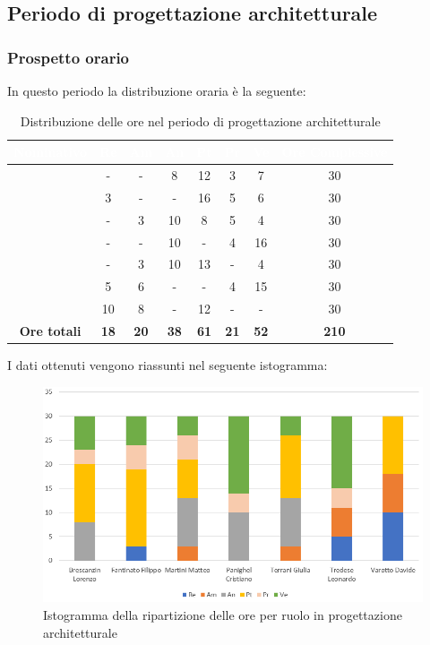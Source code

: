 \subsection{Periodo di progettazione architetturale}\label{PreventiviPArchitetturale}
\subsubsection{Prospetto orario}
In questo periodo la distribuzione oraria è la seguente:
\begin{table}[H]
	\begin{center}
		\begin{tabular}{ |c c c c c c c c| }
		\rowcolor{darkblue} 
		\textcolor{white}{\textbf{Nominativo}} & \textcolor{white}{\textbf{Re}} & \textcolor{white}{\textbf{Am}} & \textcolor{white}{\textbf{An}} & \textcolor{white}{\textbf{Pt}} & \textcolor{white}{\textbf{Pr}} & \textcolor{white}{\textbf{Ve}} & \textcolor{white}{\textbf{Ore Complessive}} \\ \hline
	\BL 	& -  	& -  	& 8 	& 12 	& 3 	& 7 	& 30 \\ \hline
	\FF 	& 3  	& -  	& - 	& 16 	& 5 	& 6  	& 30 \\ \hline
	\MM 	& -  	& 3  	& 10 	& 8 	& 5 	& 4  	& 30 \\ \hline
	\PC 	& - 	& -  	& 10 	& - 	& 4 	& 16 	& 30 \\ \hline
	\TG 	& -  	& 3 	& 10 	& 13 	& - 	& 4 	& 30 \\ \hline
	\TL 	& 5  	& 6 	& - 	& - 	& 4 	& 15 	& 30 \\ \hline
	\VD 	& 10  	& 8  	& - 	& 12 	& - 	& -  	& 30 \\ \hline
	\textbf{Ore totali} & \textbf{18} & \textbf{20} & \textbf{38} & \textbf{61} & \textbf{21} & \textbf{52} & \textbf{210} \\ \hline
\end{tabular}
	\caption{Distribuzione delle ore nel periodo di progettazione architetturale}
	\end{center}
\end{table}
I dati ottenuti vengono riassunti nel seguente istogramma:
\begin{figure}[H]
    \centering
    \includegraphics[scale = 0.70]{Immagini/ArchitetturaIsto.png}
    \caption{Istogramma della ripartizione delle ore per ruolo in progettazione architetturale}
    \label{fig:istogramma ripartizione ore, periodo di Progettazione Architetturale}
\end{figure}
\newpage
